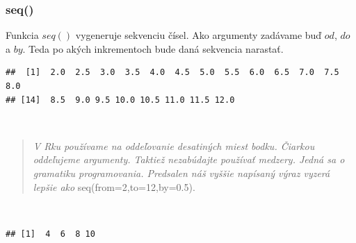\hypertarget{seq}{%
\subsubsection{seq()}\label{seq}}

Funkcia \(seq()\) vygeneruje sekvenciu čísel. Ako argumenty zadávame buď
\(od\), \(do\) a \(by\). Teda po akých inkrementoch bude daná sekvencia
narastať.

\begin{Shaded}
\begin{Highlighting}[]
\NormalTok{(} \NormalTok{, } \NormalTok{, } \NormalTok{)}
\end{Highlighting}
\end{Shaded}

\begin{verbatim}
##  [1]  2.0  2.5  3.0  3.5  4.0  4.5  5.0  5.5  6.0  6.5  7.0  7.5  8.0
## [14]  8.5  9.0 9.5 10.0 10.5 11.0 11.5 12.0
\end{verbatim}

~

\begin{quote}
\emph{V Rku používame na oddeľovanie desatiných miest bodku. Čiarkou
oddeľujeme argumenty. Taktiež nezabúdajte používať medzery. Jedná sa o
gramatiku programovania. Predsalen náš vyššie napísaný výraz vyzerá
lepšie ako} seq(from=2,to=12,by=0.5).
\end{quote}

~

\begin{Shaded}
\begin{Highlighting}[]
\NormalTok{(} \NormalTok{, } \NormalTok{, } \NormalTok{) }
\end{Highlighting}
\end{Shaded}

\begin{verbatim}
## [1]  4  6  8 10
\end{verbatim}

\begin{Shaded}
\begin{Highlighting}[]
\NormalTok{(} \NormalTok{, } \NormalTok{, } \NormalTok{)}
\end{Highlighting}
\end{Shaded}

